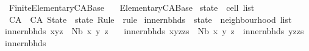 %
\begin{isabellebody}%
%
%
\isadelimdocument
%
\endisadelimdocument
%
\isatagdocument
%
\isamarkuptrue%
%
\endisatagdocument
{\isafolddocument}%
%
\isadelimdocument
%
\endisadelimdocument
%
\isadelimtheory
%
\endisadelimtheory
%
\isatagtheory
{}\isamarkupfalse%
\ Finite{\isacharunderscore}Elementary{\isacharunderscore}CA{\isacharunderscore}Base\isanewline
\ \ \ Elementary{\isacharunderscore}CA{\isacharunderscore}Base\isanewline
{}%
\endisatagtheory
{\isafoldtheory}%
%
\isadelimtheory
%
\endisadelimtheory
%
\isadelimdocument
%
\endisadelimdocument
%
\isatagdocument
%
\isamarkuptrue%
%
\endisatagdocument
{\isafolddocument}%
%
\isadelimdocument
%
\endisadelimdocument
{}\isamarkupfalse%
\ state\ {\isacharequal}\ {\isachardoublequoteopen}cell\ list{\isachardoublequoteclose}\isanewline
\isanewline
{}\isamarkupfalse%
\ CA\ {\isacharequal}\ CA\ {\isacharparenleft}State\ {\isacharcolon}\ state{\isacharparenright}\ {\isacharparenleft}Rule\ {\isacharcolon}\ rule{\isacharparenright}\isanewline
\isanewline
{}\isamarkupfalse%
\ inner{\isacharunderscore}nbhds\ {\isacharcolon}{\isacharcolon}\ {\isachardoublequoteopen}state\ {\isasymRightarrow}\ neighbourhood\ list{\isachardoublequoteclose}\ \isanewline
{\isachardoublequoteopen}inner{\isacharunderscore}nbhds\ {\isacharparenleft}x{\isacharhash}y{\isacharhash}z{\isacharhash}{\isacharbrackleft}{\isacharbrackright}{\isacharparenright}\ {\isacharequal}\ {\isacharparenleft}Nb\ x\ y\ z{\isacharparenright}\ {\isacharhash}\ {\isacharbrackleft}{\isacharbrackright}{\isachardoublequoteclose}\ {\isacharbar}\isanewline
{\isachardoublequoteopen}inner{\isacharunderscore}nbhds\ {\isacharparenleft}x{\isacharhash}y{\isacharhash}z{\isacharhash}zs{\isacharparenright}\ {\isacharequal}\ {\isacharparenleft}Nb\ x\ y\ z{\isacharparenright}\ {\isacharhash}\ {\isacharparenleft}inner{\isacharunderscore}nbhds\ {\isacharparenleft}y{\isacharhash}z{\isacharhash}zs{\isacharparenright}{\isacharparenright}{\isachardoublequoteclose}\ {\isacharbar}\isanewline
{\isachardoublequoteopen}inner{\isacharunderscore}nbhds\ {\isacharunderscore}\ {\isacharequal}\ {\isacharbrackleft}{\isacharbrackright}{\isachardoublequoteclose}%
\isadelimdocument
%
\endisadelimdocument

\end{isabellebody}
